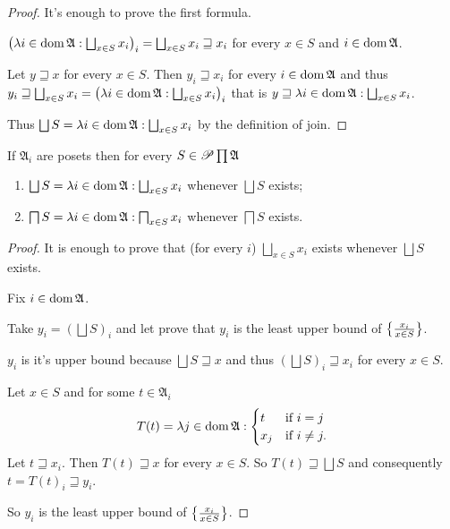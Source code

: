 \begin{proof}
It's enough to prove the first formula.

$\left(\mylambda i{\dom\mathfrak{A}}{\bigsqcup_{x\in S}x_{i}}\right)_{i}=\bigsqcup_{x\in S}x_{i}\sqsupseteq x_{i}$
for every $x\in S$ and $i\in\operatorname{dom}\mathfrak{A}$.

Let $y\sqsupseteq x$ for every $x\in S$. Then $y_{i}\sqsupseteq x_{i}$
for every $i\in\operatorname{dom}\mathfrak{A}$ and thus $y_{i}\sqsupseteq\bigsqcup_{x\in S}x_{i}=\left(\mylambda i{\dom\mathfrak{A}}{\bigsqcup_{x\in S}x_{i}}\right)_{i}$
that is $y\sqsupseteq\mylambda i{\dom\mathfrak{A}}{\bigsqcup_{x\in S}x_{i}}$.

Thus $\bigsqcup S=\mylambda i{\dom\mathfrak{A}}{\bigsqcup_{x\in S}x_{i}}$
by the definition of join.\end{proof}
\begin{cor}\label{cw-join-back}
\label{prod-join2}If $\mathfrak{A}_{i}$ are posets then for every
$S\in\mathscr{P}\prod\mathfrak{A}$
\begin{enumerate}
\item $\bigsqcup S=\mylambda i{\dom\mathfrak{A}}{\bigsqcup_{x\in S}x_{i}}$
whenever $\bigsqcup S$ exists;
\item $\bigsqcap S=\lambda i\in\operatorname{dom}\mathfrak{A}:\bigsqcap_{x\in S}x_{i}$
whenever $\bigsqcap S$ exists.
\end{enumerate}
\end{cor}
\begin{proof}
It is enough to prove that (for every $i$) $\bigsqcup_{x\in S}x_{i}$
exists whenever $\bigsqcup S$ exists.

Fix $i\in\operatorname{dom}\mathfrak{A}$.

Take $y_{i}=\left(\bigsqcup S\right)_{i}$ and let prove that $y_{i}$
is the least upper bound of $\left\{ \frac{x_{i}}{x\in S}\right\}$.

$y_{i}$ is it's upper bound because $\bigsqcup S\sqsupseteq x$
and thus $\left(\bigsqcup S\right)_{i}\sqsupseteq x_{i}$ for every
$x\in S$.

Let $x\in S$ and for some $t\in\mathfrak{A}_{i}$
\[
T(t)=\lambda j\in\operatorname{dom}\mathfrak{A}:\begin{cases}
t & \text{if }i=j\\
x_{j} & \text{if }i\ne j.
\end{cases}
\]
Let $t\sqsupseteq x_{i}$. Then $T(t)\sqsupseteq x$ for every $x\in S$.
So $T(t)\sqsupseteq\bigsqcup S$ and consequently $t=T(t)_{i}\sqsupseteq y_{i}$.

So $y_{i}$ is the least upper bound of $\left\{ \frac{x_{i}}{x\in S}\right\}$.\end{proof}
